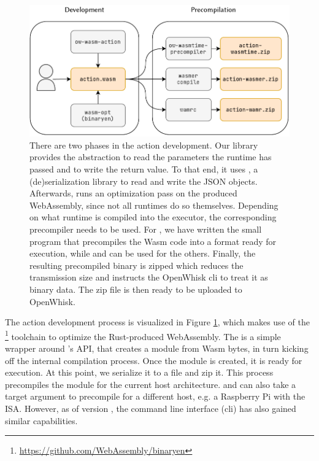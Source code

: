 \begin{figure}[ht!]
    \centering
    \includegraphics{figures/ActionCreationFlow.pdf}
    \caption{There are two phases in the action development. Our  library provides the abstraction to read the parameters the runtime has passed and to write the return value. To that end, it uses , a (de)serialization library to read and write the JSON objects. Afterwards,  runs an optimization pass on the produced WebAssembly, since not all runtimes do so themselves.
    Depending on what runtime is compiled into the executor, the corresponding precompiler needs to be used. For , we have written the small  program that precompiles the Wasm code into a format ready for execution, while  and  can be used for the others. Finally, the resulting precompiled binary is zipped which reduces the transmission size and instructs the OpenWhisk cli to treat it as binary data. The zip file is then ready to be uploaded to OpenWhisk.}
    \label{fig:action-creation-flow}
\end{figure}

The action development process is visualized in Figure \ref{fig:action-creation-flow}, which makes use of the \footnote{\url{https://github.com/WebAssembly/binaryen}} toolchain to optimize the Rust-produced WebAssembly. The  is a simple wrapper around 's API, that creates a module from Wasm bytes, in turn kicking off the internal compilation process. Once the module is created, it is ready for execution. At this point, we serialize it to a file and zip it. This process precompiles the module for the current host architecture.  and  can also take a target argument to precompile for a different host, e.g. a Raspberry Pi with the  ISA. However, as of version , the  command line interface (cli) has also gained similar capabilities.


